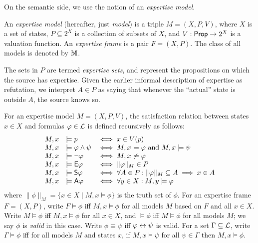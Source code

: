 On the semantic side, we use the notion of an \emph{expertise model}.

\begin{definition}
    \label{exp_def_expertise_model}

    An \emph{expertise model} (hereafter, just \emph{model})
    is a triple $M = (X, P, V)$, where $X$ is a set
    of states, $P \subseteq 2^X$ is a collection of subsets of $X$, and $V:
    \mathsf{Prop} \to 2^X$ is a valuation function. An \emph{expertise frame} is a pair
    $F = (X, P)$.  The class of all models is denoted by $\mathbb{M}$.

\end{definition}

The sets in $P$ are termed \emph{expertise sets}, and represent the
propositions on which the source has expertise. Given the earlier informal
description of expertise as refutation, we interpret $A \in P$ as saying
that whenever the ``actual'' state is outside $A$, the source knows so.

For an expertise model $M = (X, P, V)$, the satisfaction relation between
states $x \in X$ and formulas $\varphi \in \mathcal{L}$ is defined recursively
as follows:
\[
    \begin{array}{lll}
     M, x &\models p &\iff x \in V(p) \\
     M, x &\models \varphi \land \psi &\iff M, x \models \varphi \text{ and } M, x
         \models \psi \\
     M, x &\models \neg\varphi &\iff M, x \not\models \varphi \\
     M, x &\models \mathsf{E}\varphi &\iff \|\varphi\|_M \in P \\
     M, x &\models \mathsf{S}\varphi &\iff \forall A \in P: \|\varphi\|_M \subseteq A \implies
         x \in A \\
     M, x &\models \mathsf{A}\varphi &\iff \forall y \in X: M, y \models \varphi
    \end{array}
\]
where $\|\phi\|_M = \{x \in X \mid M, x \models \phi\}$ is the truth set
of $\phi$. For an expertise frame $F = (X, P)$, write $F
\models \phi$ iff $M, x \models \phi$ for all models $M$ based on
$F$ and all $x \in X$. Write $M \models \phi$ iff
$M, x \models \phi$ for all $x \in X$, and $\models \phi$ iff
$M \models \phi$ for all models $M$; we say $\phi$ is \emph{valid}
in this case. Write $\phi \equiv \psi$ iff $\varphi \leftrightarrow \psi$ is
valid. For a set $\Gamma \subseteq \mathcal{L}$, write $\Gamma \models
\phi$ iff for all models $M$ and states $x$, if $M, x \models
\psi$ for all $\psi \in \Gamma$ then $M, x \models \phi$.

